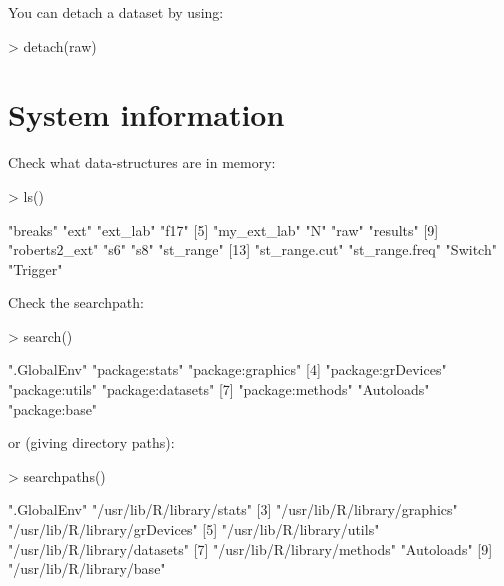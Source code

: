 \documentclass[a4paper,10pt]{article}
\begin{document}
You can detach a dataset by using:
\begin{Schunk}
\begin{Sinput}
> detach(raw)
\end{Sinput}
\end{Schunk}






\section{System information}

Check what data-structures are in memory:
\begin{Schunk}
\begin{Sinput}
> ls()
\end{Sinput}
\begin{Soutput}
 [1] "breaks"        "ext"           "ext_lab"       "f17"          
 [5] "my_ext_lab"    "N"             "raw"           "results"      
 [9] "roberts2_ext"  "s6"            "s8"            "st_range"     
[13] "st_range.cut"  "st_range.freq" "Switch"        "Trigger"      
\end{Soutput}
\end{Schunk}

Check the searchpath:
\begin{Schunk}
\begin{Sinput}
> search()
\end{Sinput}
\begin{Soutput}
[1] ".GlobalEnv"        "package:stats"     "package:graphics" 
[4] "package:grDevices" "package:utils"     "package:datasets" 
[7] "package:methods"   "Autoloads"         "package:base"     
\end{Soutput}
\end{Schunk}

or (giving directory paths):
\begin{Schunk}
\begin{Sinput}
> searchpaths()
\end{Sinput}
\begin{Soutput}
[1] ".GlobalEnv"                   "/usr/lib/R/library/stats"    
[3] "/usr/lib/R/library/graphics"  "/usr/lib/R/library/grDevices"
[5] "/usr/lib/R/library/utils"     "/usr/lib/R/library/datasets" 
[7] "/usr/lib/R/library/methods"   "Autoloads"                   
[9] "/usr/lib/R/library/base"     
\end{Soutput}
\end{Schunk}
\end{document}
